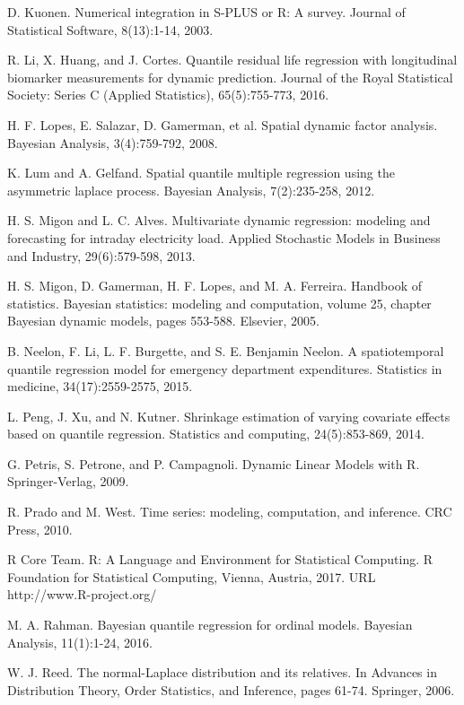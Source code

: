\documentclass[12pt,a4paper]{article}\usepackage[]{graphicx}\usepackage[]{color}\usepackage{subfigure}
\begin{document}
\begin{thebibliography}{HHH11}
D. Kuonen. Numerical integration in S-PLUS or R: A survey. Journal of
Statistical Software, 8(13):1-14, 2003.

R. Li, X. Huang, and J. Cortes. Quantile residual life regression with
longitudinal biomarker measurements for dynamic prediction. Journal of
the Royal Statistical Society: Series C (Applied Statistics), 65(5):755-773,
2016.

H. F. Lopes, E. Salazar, D. Gamerman, et al. Spatial dynamic factor analysis.
Bayesian Analysis, 3(4):759-792, 2008.

K. Lum and A. Gelfand. Spatial quantile multiple regression using the
asymmetric laplace process. Bayesian Analysis, 7(2):235-258, 2012.

H. S. Migon and L. C. Alves. Multivariate dynamic regression: modeling
and forecasting for intraday electricity load. Applied Stochastic Models in
Business and Industry, 29(6):579-598, 2013.

H. S. Migon, D. Gamerman, H. F. Lopes, and M. A. Ferreira. Handbook
of statistics. Bayesian statistics: modeling and computation, volume 25,
chapter Bayesian dynamic models, pages 553-588. Elsevier, 2005.

B. Neelon, F. Li, L. F. Burgette, and S. E. Benjamin Neelon. A
spatiotemporal quantile regression model for emergency department
expenditures. Statistics in medicine, 34(17):2559-2575, 2015.

L. Peng, J. Xu, and N. Kutner. Shrinkage estimation of varying covariate
effects based on quantile regression. Statistics and computing, 24(5):853-869, 2014.

G. Petris, S. Petrone, and P. Campagnoli. Dynamic Linear Models with R. Springer-Verlag, 2009.

R. Prado and M. West. Time series: modeling, computation, and inference.
CRC Press, 2010.

R Core Team. R: A Language and Environment for Statistical Computing.
R Foundation for Statistical Computing, Vienna, Austria, 2017. URL
http://www.R-project.org/

M. A. Rahman. Bayesian quantile regression for ordinal models. Bayesian
Analysis, 11(1):1-24, 2016.

W. J. Reed. The normal-Laplace distribution and its relatives. In Advances
in Distribution Theory, Order Statistics, and Inference, pages 61-74.
Springer, 2006.


\end{thebibliography}
\end{document}
